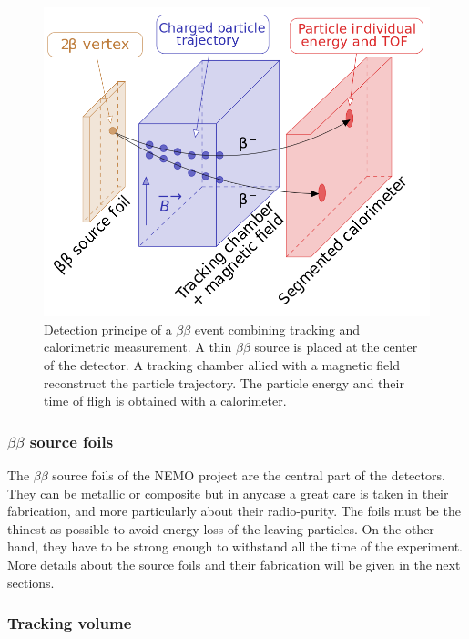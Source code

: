 \documentclass[main.tex]{subfiles}
\begin{document}
\begin{figure}[h!]
\begin{center}
\includegraphics[scale=0.30]{pictures/Chap3/SchemaNEMO.png}
\caption{Detection principe of a $\beta\beta$ event combining tracking and calorimetric measurement. A thin $\beta\beta$ source is placed at the center of the detector. A tracking chamber allied with a magnetic field reconstruct the particle trajectory. The particle energy and their time of fligh is obtained with a calorimeter.}
\label{SchemaNEMOl}
\end{center}
\end{figure}


\subsubsection{$\beta\beta$ source foils}


\NI The $\beta\beta$ source foils of the NEMO project are the central part of the detectors. They can be metallic or composite but in anycase a great care is taken in their fabrication, and more particularly about their radio-purity. The foils must be the thinest as possible to avoid energy loss of the leaving particles. On the other hand, they have to be strong enough to withstand all the time of the experiment. More details about the source foils and their fabrication will be given in the next sections.


\subsubsection{Tracking volume}
\end{document}
